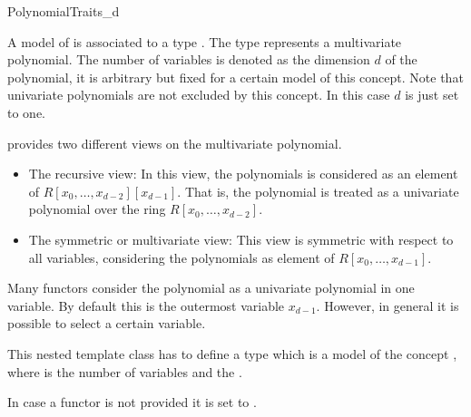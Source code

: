 \begin{ccRefConcept}{PolynomialTraits_d}

\ccDefinition
A model of  is associated to a type 
. 
The type  represents a multivariate polynomial.
The number of variables is denoted as the dimension $d$ of the polynomial,
it is arbitrary but fixed for a certain model of this concept.  
Note that univariate polynomials are not excluded by this concept. In this case 
$d$ is just set to one.  

 provides two different views on the 
multivariate polynomial. 

\begin{itemize}
\item The recursive view:  In this view, the polynomials is considered as 
an element of $R[x_0,\dots,x_{d-2}][x_{d-1}]$. That is, the polynomial 
is treated as a univariate polynomial over the ring $R[x_0,\dots,x_{d-2}]$. 
\item The symmetric or multivariate view: This view is symmetric 
with respect to all variables,
considering the polynomials as element of $R [x_0,\dots,x_{d-1}]$.
\end{itemize}

Many functors consider the polynomial as a univariate polynomial in one variable.
By default this is the outermost variable $x_{d-1}$. However, in general it 
is possible to select a certain variable. 

\ccRefines


\ccConstants
 

\ccTypes

\ccGlue
{}\ccGlue
{}

{This nested template class has to define a type  which is a model 
of the concept , where  is the number of 
variables and  the .}


In case a functor is not provided it is set to .


\end{ccRefConcept}
